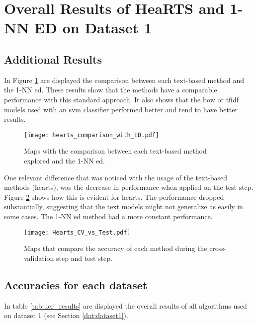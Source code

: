 \section{Overall Results of HeaRTS and 1-NN ED on Dataset 1}
\label{app:overall_ucr_results}

\subsection{Additional Results}

In Figure \ref{fig:comparison_with_ed} are displayed the comparison between each text-based method and the 1-NN \gls{ed}. These results show that the methods have a comparable performance with this standard approach. It also shows that the \gls{bow} or \gls{tfidf} models used with an \gls{svm} classifier performed better and tend to have better results.

\begin{figure}
\centering
\texttt{[image: hearts\_comparison\_with\_ED.pdf]}
\caption{Maps with the comparison between each text-based method explored and the 1-NN \gls{ed}.}
\label{fig:comparison_with_ed}
\end{figure}

One relevant difference that was noticed with the usage of the text-based methods (\gls{hearts}), was the decrease in performance when applied on the test step. Figure \ref{fig:cv_vs_test} shows how this is evident for \gls{hearts}. The performance dropped substantially, suggesting that the text models might not generalize as easily in some cases. The 1-NN \gls{ed} method had a more constant performance.

\begin{figure}
\texttt{[image: Hearts\_CV\_vs\_Test.pdf]}
\caption{Maps that compare the accuracy of each method during the cross-validation step and test step.}
\label{fig:cv_vs_test}
\end{figure}


\subsection{Accuracies for each dataset}
\label{subsec:hearts_all_accuracies}

In table \ref{tab:ucr_results} are displayed the overall results of all algorithms used on dataset 1 (see Section \ref{dat:dataset1}). 

